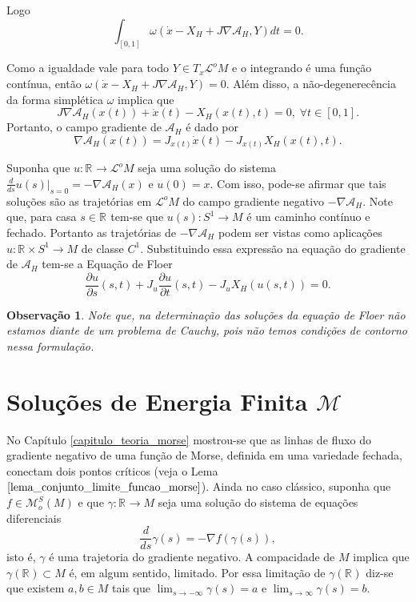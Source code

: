 \documentclass[12pt]{book}
\newtheorem{observacao}[teorema]{Observação}
\newcommand{\campohamiltoniano}[1]{X_{H}(#1)}
\newcommand{\campohamiltonianoabrev}{X_{H}}
\newcommand{\circulo}{S^{1}}
\newcommand{\derivada}[2]{\frac{d #1}{d #2}}
\newcommand{\derivadaparcial}[2]{\frac{\partial #1}{\partial #2}}
\newcommand{\energiafinitaM}{\mathcal{M}}
\newcommand{\espacotangenteponto}[2]{T_{#1}#2}
\newcommand{\funcionalH}{\mathcal{A}_{H}}
\newcommand{\funcoesmorsesmale}[1]{\mathcal{M}^{S}_{o}(#1)}
\newcommand{\gradiente}{\nabla f}
\newcommand{\gradientefuncional}{\nabla \funcionalH}
\newcommand{\intervalo}{[0,1]}
\newcommand{\operadorFloerDefParametros}[1]{\derivadaparcial{#1}{s}(s,t) + J_{#1}\derivadaparcial{#1}{t}(s,t) - J_{#1}X_{H}(#1(s,t))}
\newcommand{\retacartesianocirculo}{\real{} \times \circulo}
\newcommand{\real}[1]{\mathbb{R}^{#1}}
\newcommand{\reta}{\real{}}
\newcommand{\lacocontrateis}{\mathcal{L}^{o}M}
\begin{document}
	Logo
	$$
	\int_{[0,1]} \omega(\dot{x} - \campohamiltonianoabrev + J\gradientefuncional, Y)dt = 0.
	$$
	
	Como a igualdade vale para todo $Y \in \espacotangenteponto{x}{\lacocontrateis}$ e o integrando é uma função contínua, então $\omega(\dot{x} - \campohamiltonianoabrev + J\gradientefuncional, Y)=0$. Além disso, a não-degenerecência da forma simplética $\omega$ implica que
	$$
	J\gradientefuncional(x(t)) +\dot{x}(t)-\campohamiltoniano{x(t), t} = 0, \; \forall t \in \intervalo.
	$$
	Portanto, o campo gradiente de $\funcionalH$ é dado por
	$$
	\gradientefuncional(x(t))= J_{x(t)}\dot{x}(t)-J_{x(t)}\campohamiltoniano{x(t), t}.
	$$
	
	Suponha que $u :\reta\to \lacocontrateis$ seja uma solução do sistema $\derivada{}{s}u(s)|_{s=0} = -\gradientefuncional(x)$ e $u(0)=x$. Com isso, pode-se afirmar que tais soluções são as trajetórias em $\lacocontrateis$ do campo gradiente negativo $-\gradientefuncional$. Note que, para casa $s\in \reta$ tem-se que $u(s):\circulo\to M$ é um caminho contínuo e fechado. Portanto as trajetórias de $-\gradientefuncional$ podem ser vistas como aplicações $u:\retacartesianocirculo \to M$ de classe $C^{1}$. Substituindo essa expressão na equação do gradiente de $\funcionalH$ tem-se a Equação de Floer
	$$
	\operadorFloerDefParametros{u}=0.
	$$

	\begin{observacao}
		Note que, na determinação das soluções da equação de Floer não estamos diante de um problema de Cauchy, pois não temos condições de contorno nessa formulação.
	\end{observacao}
	
	\section{Soluções de Energia Finita $\energiafinitaM$}\label{secao_funcional_energia}
	
	No Capítulo \ref{capitulo_teoria_morse} mostrou-se que as linhas de fluxo do gradiente negativo de uma função de Morse, definida em uma variedade fechada, conectam dois pontos críticos (veja o Lema $\ref{lema_conjunto_limite_funcao_morse}$). Ainda no caso clássico, suponha que $f \in \funcoesmorsesmale{M}$ e que $\gamma:\reta \to M$ seja uma solução do sistema de equações diferenciais
	$$
	\derivada{}{s}\gamma(s)=-\gradiente(\gamma(s)),
	$$
	isto é, $\gamma$ é uma trajetoria do gradiente negativo. A compacidade de $M$ implica que $\gamma(\reta) \subset M$ é, em algum sentido, limitado. Por essa limitação de $\gamma(\reta)$ diz-se que existem $a, b \in M$ tais que $\lim_{s\to -\infty}\gamma(s)=a$ e $\lim_{s\to \infty}\gamma(s)=b$. 
	
\end{document}
